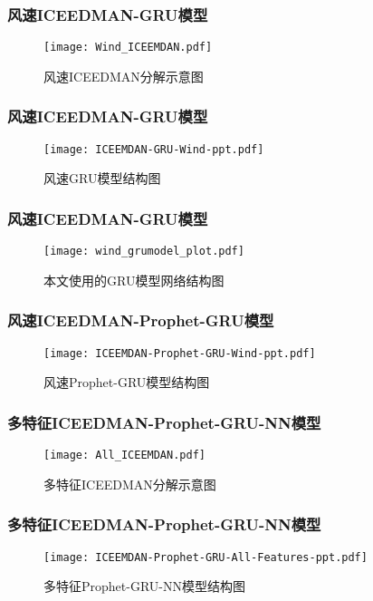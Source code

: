\documentclass[14pt, AutoFakeBold]{ppt}
\begin{document}
\begin{frame}
  \frametitle{风速ICEEDMAN-GRU模型}
  \begin{figure}[H]
    \centering
      \texttt{[image: Wind\_ICEEMDAN.pdf]}
      \caption{风速ICEEDMAN分解示意图}
      \label{fig_Wind_ICEEMDAN}
  \end{figure}
\end{frame}

\begin{frame}
  \frametitle{风速ICEEDMAN-GRU模型}
  \begin{figure}[H]
    \centering
      \texttt{[image: ICEEMDAN-GRU-Wind-ppt.pdf]}
      \caption{风速GRU模型结构图}
      \label{fig_ICEEMDAN_GRU_Wind}
  \end{figure}
\end{frame}

\begin{frame}
  \frametitle{风速ICEEDMAN-GRU模型}
  \begin{figure}[H]
    \centering
      \texttt{[image: wind\_grumodel\_plot.pdf]}
      \caption{本文使用的GRU模型网络结构图}
      \label{fig_gru}
  \end{figure}
\end{frame}

\begin{frame}
  \frametitle{风速ICEEDMAN-Prophet-GRU模型}
  \begin{figure}[H]
    \centering
      \texttt{[image: ICEEMDAN-Prophet-GRU-Wind-ppt.pdf]}
      \caption{风速Prophet-GRU模型结构图}
      \label{fig_ICEEMDAN_Prophet_GRU_Wind}
  \end{figure}  
\end{frame}

\begin{frame}
  \frametitle{多特征ICEEDMAN-Prophet-GRU-NN模型}
  \begin{figure}[H]
    \centering
      \texttt{[image: All\_ICEEMDAN.pdf]}
      \caption{多特征ICEEDMAN分解示意图}
      \label{fig_All_ICEEMDAN}
  \end{figure}
\end{frame}

\begin{frame}
  \frametitle{多特征ICEEDMAN-Prophet-GRU-NN模型}
  \begin{figure}[H]
    \centering
      \texttt{[image: ICEEMDAN-Prophet-GRU-All-Features-ppt.pdf]}
      \caption{多特征Prophet-GRU-NN模型结构图}
      \label{fig_ICEEMDAN_Prophet_GRU_All_Features}
  \end{figure}
\end{frame}
\end{document}
